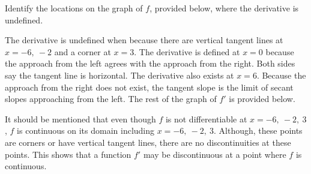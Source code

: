 \documentclass{book}
\begin{document}
\begin{Exam} Identify the locations on the graph of $f$, provided below, where the derivative is undefined.\vspace{-15pt}
\begin{center}
\end{center}

The derivative is undefined when  because there are vertical tangent lines at $x=-6,\ -2$ and a corner at $x= 3$. The derivative is defined at $x=0$ because the approach from the left agrees with the approach from the right. Both sides say the tangent line is horizontal. The derivative also exists at $x = 6$. Because the approach from the right does not exist, the tangent slope is the limit of secant slopes approaching from the left. The rest of the graph of $f'$ is provided below.\vspace{-10pt}
\begin{center}
\end{center}

It should be mentioned that even though $f$ is not differentiable at $x=-6,\ -2,\ 3$, $f$ is continuous on its domain including $x=-6,\ -2,\ 3$. Although, these points are corners or have vertical tangent lines, there are no discontinuities at these points. This shows that a function $f'$ may be discontinuous at a point where $f$ is continuous. 
\end{Exam}\vs
\end{document}
